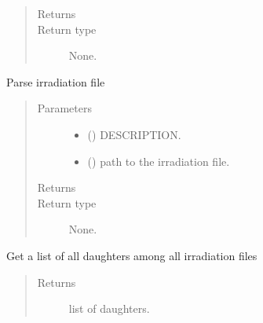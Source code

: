 \documentclass[letterpaper,10pt,english]{sphinxmanual}
\begin{document}
\begin{fulllineitems}
\begin{quote}
\begin{description}
\item[{Returns}] \leavevmode


\item[{Return type}] \leavevmode
None.

\end{description}\end{quote}

\begin{fulllineitems}
\label{\detokenize{api/inputgeneration:parsersD1S.IrradiationFile.from_text}}
Parse irradiation file
\begin{quote}\begin{description}
\item[{Parameters}] \leavevmode\begin{itemize}
\item {} 
 () \textendash{} DESCRIPTION.

\item {} 
 () \textendash{} path to the irradiation file.

\end{itemize}

\item[{Returns}] \leavevmode


\item[{Return type}] \leavevmode
None.

\end{description}\end{quote}

\end{fulllineitems}


\begin{fulllineitems}
\label{\detokenize{api/inputgeneration:parsersD1S.IrradiationFile.get_daughters}}
Get a list of all daughters among all irradiation files
\begin{quote}\begin{description}
\item[{Returns}] \leavevmode
list of daughters.


\end{description}
\end{quote}
\end{fulllineitems}
\end{fulllineitems}
\end{document}
